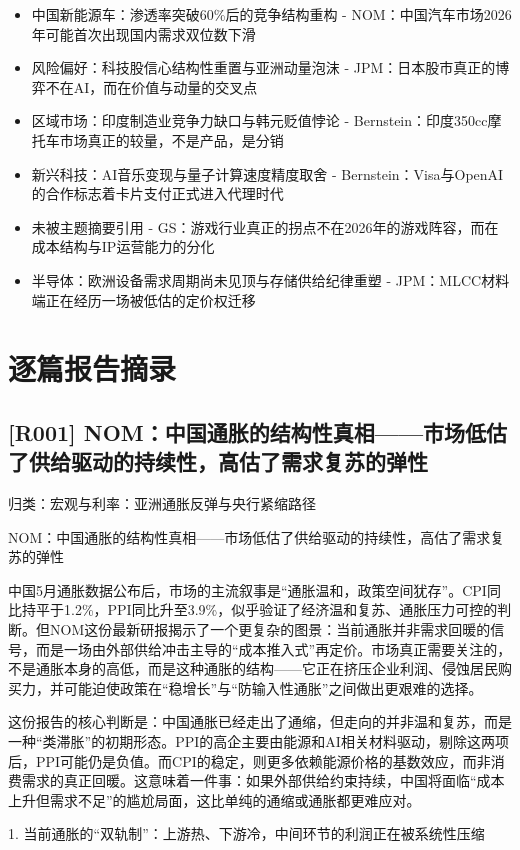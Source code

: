 \documentclass[11pt]{ctexart}
\begin{document}
\begin{itemize}
  \item [R045] 中国新能源车：渗透率突破60\%后的竞争结构重构 - NOM：中国汽车市场2026年可能首次出现国内需求双位数下滑
  \item [R046] 风险偏好：科技股信心结构性重置与亚洲动量泡沫 - JPM：日本股市真正的博弈不在AI，而在价值与动量的交叉点
  \item [R047] 区域市场：印度制造业竞争力缺口与韩元贬值悖论 - Bernstein：印度350cc摩托车市场真正的较量，不是产品，是分销
  \item [R048] 新兴科技：AI音乐变现与量子计算速度精度取舍 - Bernstein：Visa与OpenAI的合作标志着卡片支付正式进入代理时代
  \item [R049] 未被主题摘要引用 - GS：游戏行业真正的拐点不在2026年的游戏阵容，而在成本结构与IP运营能力的分化
  \item [R050] 半导体：欧洲设备需求周期尚未见顶与存储供给纪律重塑 - JPM：MLCC材料端正在经历一场被低估的定价权迁移
\end{itemize}
\section{逐篇报告摘录}
\subsection{[R001] NOM：中国通胀的结构性真相——市场低估了供给驱动的持续性，高估了需求复苏的弹性}
{\small\color{refgray}归类：宏观与利率：亚洲通胀反弹与央行紧缩路径}

NOM：中国通胀的结构性真相——市场低估了供给驱动的持续性，高估了需求复苏的弹性

中国5月通胀数据公布后，市场的主流叙事是“通胀温和，政策空间犹存”。CPI同比持平于1.2\%，PPI同比升至3.9\%，似乎验证了经济温和复苏、通胀压力可控的判断。但NOM这份最新研报揭示了一个更复杂的图景：当前通胀并非需求回暖的信号，而是一场由外部供给冲击主导的“成本推入式”再定价。市场真正需要关注的，不是通胀本身的高低，而是这种通胀的结构——它正在挤压企业利润、侵蚀居民购买力，并可能迫使政策在“稳增长”与“防输入性通胀”之间做出更艰难的选择。

这份报告的核心判断是：中国通胀已经走出了通缩，但走向的并非温和复苏，而是一种“类滞胀”的初期形态。PPI的高企主要由能源和AI相关材料驱动，剔除这两项后，PPI可能仍是负值。而CPI的稳定，则更多依赖能源价格的基数效应，而非消费需求的真正回暖。这意味着一件事：如果外部供给约束持续，中国将面临“成本上升但需求不足”的尴尬局面，这比单纯的通缩或通胀都更难应对。

1. 当前通胀的“双轨制”：上游热、下游冷，中间环节的利润正在被系统性压缩
\end{document}
